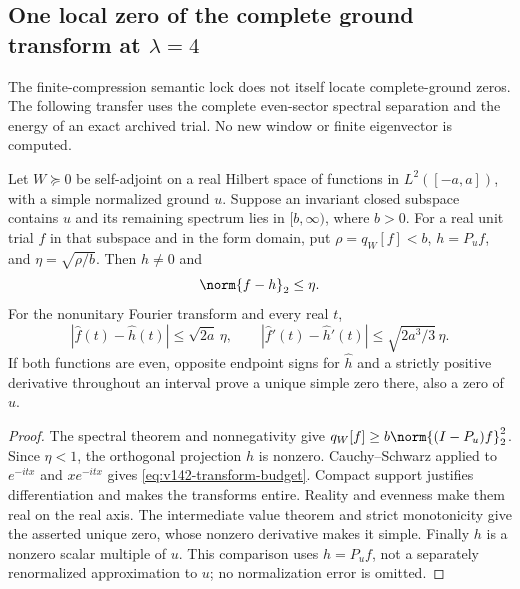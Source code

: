 \subsection*{One local zero of the complete ground transform at $\lambda=4$}

The finite-compression semantic lock does not itself locate complete-ground
zeros. The following transfer uses the complete even-sector spectral
separation and the energy of an exact archived trial. No new window or
finite eigenvector is computed.

\begin{lemma}
\label{lem:v142-energy-projection}
Let $W\succeq0$ be self-adjoint on a real Hilbert space of functions in
$L^2([-a,a])$, with a simple normalized ground $u$. Suppose an invariant
closed subspace contains $u$ and its remaining spectrum lies in
$[b,\infty)$, where $b>0$. For a real unit trial $f$ in that subspace and
in the form domain, put $\rho=q_W[f]<b$, $h=P_u f$, and
$\eta=\sqrt{\rho/b}$. Then $h\ne0$ and
\[
 \norm{f-h}_2\le\eta.
\]
For the nonunitary Fourier transform and every real $t$,
\begin{equation}\label{eq:v142-transform-budget}
 |\widehat f(t)-\widehat h(t)|\le\sqrt{2a}\,\eta,
 \qquad
 |\widehat f'(t)-\widehat h'(t)|\le\sqrt{2a^3/3}\,\eta.
\end{equation}
If both functions are even, opposite endpoint signs for $\widehat h$
and a strictly positive derivative throughout an interval prove a
unique simple zero there, also a zero of $\widehat u$.
\end{lemma}
\begin{proof}
The spectral theorem and nonnegativity give
$q_W[f]\ge b\norm{(I-P_u)f}_2^2$. Since $\eta<1$, the orthogonal
projection $h$ is nonzero. Cauchy--Schwarz applied to $e^{-itx}$ and
$xe^{-itx}$ gives \eqref{eq:v142-transform-budget}. Compact support
justifies differentiation and makes the transforms entire. Reality
and evenness make them real on the real axis. The intermediate value
theorem and strict monotonicity give the asserted unique zero, whose
nonzero derivative makes it simple. Finally $h$ is a nonzero scalar
multiple of $u$. This comparison uses $h=P_u f$, not a separately
renormalized approximation to $u$; no normalization error is omitted.
\end{proof}

